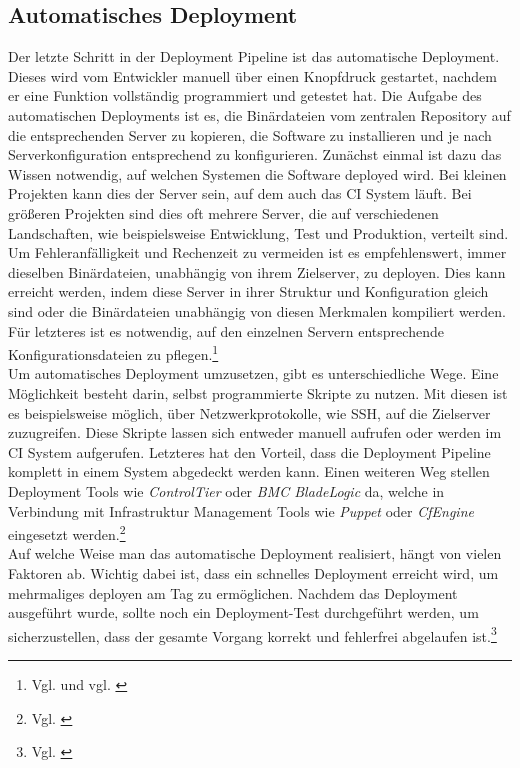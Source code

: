 \subsection{Automatisches Deployment}
Der letzte Schritt in der Deployment Pipeline ist das automatische Deployment. Dieses wird vom Entwickler manuell über einen Knopfdruck gestartet, nachdem er eine Funktion vollständig programmiert und getestet hat. Die Aufgabe des automatischen Deployments ist es, die Binärdateien vom zentralen Repository auf die entsprechenden Server zu kopieren, die Software zu installieren und je nach Serverkonfiguration entsprechend zu konfigurieren. Zunächst einmal ist dazu das Wissen notwendig, auf welchen Systemen die Software deployed wird. Bei kleinen Projekten kann dies der Server sein, auf dem auch das \acs{CI} System läuft. Bei größeren Projekten sind dies oft mehrere Server, die auf verschiedenen Landschaften, wie beispielsweise Entwicklung, Test und Produktion, verteilt sind. Um Fehleranfälligkeit und Rechenzeit zu vermeiden ist es empfehlenswert, immer dieselben Binärdateien, unabhängig von ihrem Zielserver, zu deployen. Dies kann erreicht werden, indem diese Server in ihrer Struktur und Konfiguration gleich sind oder die Binärdateien unabhängig von diesen Merkmalen kompiliert werden. Für letzteres ist es notwendig, auf den einzelnen Servern entsprechende Konfigurationsdateien zu pflegen.\footnote{Vgl. \cite[Seite 134f]{continuous_dev} und vgl. \cite[Seite 61]{swartout_continuous_2012}}\\
Um automatisches Deployment umzusetzen, gibt es unterschiedliche Wege. Eine Möglichkeit besteht darin, selbst programmierte Skripte zu nutzen. Mit diesen ist es  beispielsweise möglich, über Netzwerkprotokolle, wie \acs{SSH}, auf die Zielserver zuzugreifen. Diese Skripte lassen sich entweder manuell aufrufen oder werden im \acs{CI} System aufgerufen. Letzteres hat den Vorteil, dass die Deployment Pipeline komplett in einem System abgedeckt werden kann. Einen weiteren Weg stellen Deployment Tools  wie \textit{ControlTier} oder \textit{BMC BladeLogic} da, welche in Verbindung mit Infrastruktur Management Tools wie \textit{Puppet} oder \textit{CfEngine}  eingesetzt werden.\footnote{Vgl. \cite[Seite 160ff]{continuous_dev}}\\
Auf welche Weise man das automatische Deployment realisiert, hängt von vielen Faktoren ab. Wichtig dabei ist, dass ein schnelles Deployment erreicht wird, um mehrmaliges deployen am Tag zu ermöglichen.
Nachdem das Deployment ausgeführt wurde, sollte noch ein Deployment-Test durchgeführt werden, um sicherzustellen, dass der gesamte Vorgang korrekt und fehlerfrei abgelaufen ist.\footnote{Vgl. \cite[Seite 163]{continuous_dev}}\\
